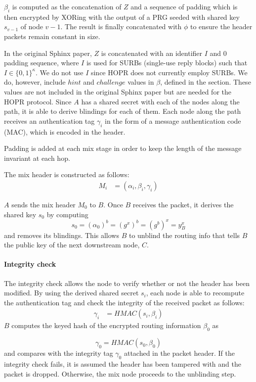 $\beta_i$ is computed as the concatenation of $Z$ and a sequence of padding which is then encrypted by XORing with the output of a PRG seeded with shared key $s_{v-1}$ of node $v-1$. The result is finally concatenated with $\phi$ to ensure the header packets remain constant in size.
    
In the original Sphinx paper, $Z$ is concatenated with an identifier $I$
    and $0$ padding sequence, where $I$ is used for SURBs (single-use reply
    blocks) such that $I \in \{0, 1\}^\kappa$. We do not use $I$ since HOPR does not
    currently employ SURBs. We do, however, include $hint$ and $challenge$ values in
    $\beta$, defined in the  section. These values are not included in the original Sphinx paper but are needed for the HOPR protocol.
    Since $A$ has a shared secret with each of the nodes along the path, it is able to derive blindings for each of them.
    Each node along the path receives an authentication tag $\gamma_i$ in the form of a message authentication code (MAC),
which is encoded in the header.

Padding is added at each mix stage in order to keep the length of the message invariant at each hop.

The mix header is constructed as follows: 
\begin{align}  
    M_i&=(\alpha_i,\beta_i,\gamma_i)
\end{align}

$A$ sends the mix header $M_0$ to $B$. Once $B$ receives the packet, it derives the shared key $s_0$ by computing $$s_0=(\alpha_0)^b=(g^x)^b=(g^b)^x=y^x_B$$
and removes its blindings. This allows $B$ to unblind the routing info that tells $B$ the public key of the next downstream node, $C$.
\paragraph{Integrity check}
The integrity check allows the node to verify whether or not the header has been modified. By using the derived shared secret $s_i$, each node is able to recompute the authentication tag and check the integrity of the received packet as follows: 
\begin{align}  
    \gamma_i&=HMAC(s_i,\beta_i)
    \label{eq:6}
\end{align}
$B$ computes the keyed hash of the encrypted routing information $\beta_0$ as

    $$\gamma_0=HMAC(s_0,\beta_0)$$
and compares with the integrity tag $\gamma_0$ attached in the packet header. If the integrity check fails, it is assumed the header has been tampered with and the packet is dropped. Otherwise, the mix node proceeds to the unblinding step.

